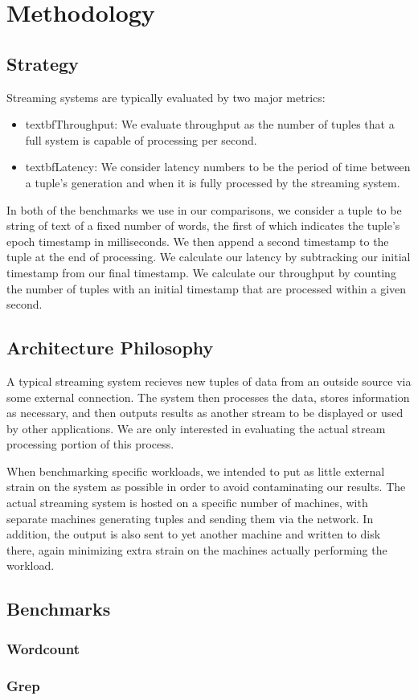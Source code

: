 \section{Methodology}
\subsection{Strategy}
Streaming systems are typically evaluated by two major metrics:
\begin{itemize}
\item textbf{Throughput:} We evaluate throughput as the number of tuples that a full system is capable of processing per second.
\item textbf{Latency:} We consider latency numbers to be the period of time between a tuple's generation and when it is fully processed by the streaming system.
\end{itemize}

In both of the benchmarks we use in our comparisons, we consider a tuple to be string of text of a fixed number of words, the first of which indicates the tuple's epoch timestamp in milliseconds.  We then append a second timestamp to the tuple at the end of processing.  We calculate our latency by subtracking our initial timestamp from our final timestamp.  We calculate our throughput by counting the number of tuples with an initial timestamp that are processed within a given second.

\subsection{Architecture Philosophy}
A typical streaming system recieves new tuples of data from an outside source via some external connection.  The system then processes the data, stores information as necessary, and then outputs results as another stream to be displayed or used by other applications.  We are only interested in evaluating the actual stream processing portion of this process.

When benchmarking specific workloads, we intended to put as little external strain on the system as possible in order to avoid contaminating our results.  The actual streaming system is hosted on a specific number of machines, with separate machines generating tuples and sending them via the network.  In addition, the output is also sent to yet another machine and written to disk there, again minimizing extra strain on the machines actually performing the workload.




\subsection{Benchmarks}
\subsubsection{Wordcount}
\subsubsection{Grep}

